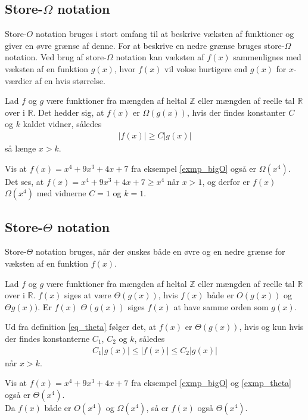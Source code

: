 \subsection{Store-$\Omega$ notation}
Store-$O$ notation bruges i stort omfang til at beskrive væksten af funktioner og giver en øvre grænse af denne. 
For at beskrive en nedre grænse bruges store-$\Omega$ notation. Ved brug af store-$\Omega$ notation kan væksten af $f(x)$ sammenlignes med væksten af en funktion $g(x)$, hvor $f(x)$ vil vokse hurtigere end $g(x)$ for $x$-værdier af en hvis størrelse. \\
\begin{defn}
	Lad $f$ og $g$ være funktioner fra mængden af heltal $\mathbb{Z}$ eller mængden af reelle tal $\mathbb{R}$ over i $\mathbb{R}$. 
	Det hedder sig, at $f(x)$ er $\Omega(g(x))$, hvis der findes konstanter $C$ og $k$ kaldet vidner, således 
	\begin{align*}
		|f(x)| \geq C |g(x)|
	\end{align*}
så længe $x>k$.
\end{defn}

\begin{exmp}\label{exmp_theta}
Vis at $f(x)=x^4+9x^3+4x+7$ fra eksempel \ref{exmp_bigO} også er $\Omega(x^4)$. \\
Det ses, at $f(x)=x^4+9x^3+4x+7 \geq x^4 $ når $x>1$, og derfor er $f(x)$ $\Omega(x^4)$ med vidnerne $C=1$ og $k=1$.
\end{exmp}

\subsection{Store-$\Theta$ notation}
Store-$\Theta$ notation bruges, når der ønskes både en øvre og en nedre grænse for væksten af en funktion $f(x)$. \\
\begin{defn}\label{eq_theta}
	Lad $f$ og $g$ være funktioner fra mængden af heltal $\mathbb{Z}$ eller mængden af reelle tal $\mathbb{R}$ over i $\mathbb{R}$. 
	$f(x)$ siges at være $\Theta (g(x))$, hvis $f(x)$ både er $O(g(x))$ og $\Theta g(x))$. 
	Er $f(x)$ $\Theta (g(x))$ siges $f(x)$ at have samme orden som $g(x)$. 
\end{defn}
Ud fra definition \ref{eq_theta} følger det, at $f(x)$ er $\Theta (g(x))$, hvis og kun hvis der findes konstanterne $C_1$, $C_2$ og $k$, således
\begin{align*}
	C_1 |g(x)| \leq |f(x)| \leq C_2 |g(x)|
\end{align*}
når $x>k$. \\
\begin{exmp}
	Vis at $f(x)=x^4+9x^3+4x+7$ fra eksempel \ref{exmp_bigO} og \ref{exmp_theta} også er $\Theta(x^4)$. \\
	Da $f(x)$ både er $O(x^4)$ og $\Omega (x^4)$, så er $f(x)$ også $\Theta (x^4)$.
\end{exmp}

